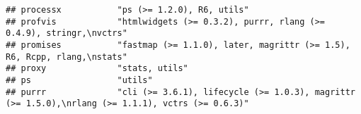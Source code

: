 \documentclass[
]{article}
\begin{document}
\begin{verbatim}
## processx           "ps (>= 1.2.0), R6, utils"                                                                                                                                                                                                                                                                                                                                                                                                                   
## profvis            "htmlwidgets (>= 0.3.2), purrr, rlang (>= 0.4.9), stringr,\nvctrs"                                                                                                                                                                                                                                                                                                                                                                           
## promises           "fastmap (>= 1.1.0), later, magrittr (>= 1.5), R6, Rcpp, rlang,\nstats"                                                                                                                                                                                                                                                                                                                                                                      
## proxy              "stats, utils"                                                                                                                                                                                                                                                                                                                                                                                                                               
## ps                 "utils"                                                                                                                                                                                                                                                                                                                                                                                                                                      
## purrr              "cli (>= 3.6.1), lifecycle (>= 1.0.3), magrittr (>= 1.5.0),\nrlang (>= 1.1.1), vctrs (>= 0.6.3)"                                                                                                                                                                                                                                                                                                                                             

\end{verbatim}
\end{document}
